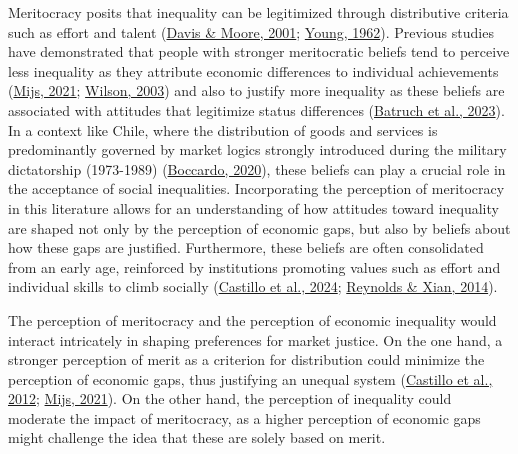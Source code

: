 \documentclass[
  12pt,
]{article}
\begin{document}
Meritocracy posits that inequality can be legitimized through
distributive criteria such as effort and talent
(\protect\hyperlink{ref-davis_principles_2001}{Davis \& Moore, 2001};
\protect\hyperlink{ref-young_rise_1962}{Young, 1962}). Previous studies
have demonstrated that people with stronger meritocratic beliefs tend to
perceive less inequality as they attribute economic differences to
individual achievements (\protect\hyperlink{ref-mijs_paradox_2021}{Mijs,
2021}; \protect\hyperlink{ref-wilson_role_2003}{Wilson, 2003}) and also
to justify more inequality as these beliefs are associated with
attitudes that legitimize status differences
(\protect\hyperlink{ref-batruch_belief_2023}{Batruch et al., 2023}). In
a context like Chile, where the distribution of goods and services is
predominantly governed by market logics strongly introduced during the
military dictatorship (1973-1989)
(\protect\hyperlink{ref-boccardo_30_2020}{Boccardo, 2020}), these
beliefs can play a crucial role in the acceptance of social
inequalities. Incorporating the perception of meritocracy in this
literature allows for an understanding of how attitudes toward
inequality are shaped not only by the perception of economic gaps, but
also by beliefs about how these gaps are justified. Furthermore, these
beliefs are often consolidated from an early age, reinforced by
institutions promoting values such as effort and individual skills to
climb socially
(\protect\hyperlink{ref-castillo_socialization_2024}{Castillo et al.,
2024}; \protect\hyperlink{ref-reynolds_perceptions_2014}{Reynolds \&
Xian, 2014}).

The perception of meritocracy and the perception of economic inequality
would interact intricately in shaping preferences for market justice. On
the one hand, a stronger perception of merit as a criterion for
distribution could minimize the perception of economic gaps, thus
justifying an unequal system
(\protect\hyperlink{ref-castillo_percepcion_2019}{Castillo et al.,
2012}; \protect\hyperlink{ref-mijs_paradox_2021}{Mijs, 2021}). On the
other hand, the perception of inequality could moderate the impact of
meritocracy, as a higher perception of economic gaps might challenge the
idea that these are solely based on merit.
\end{document}
